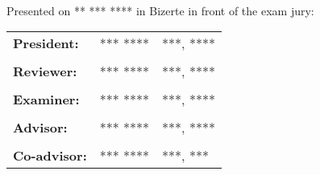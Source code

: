 \begin{titlepage}
\begin{center}
        \HRule \\%
    \end{center}
    \begin{center}
        Presented on ** *** **** in Bizerte in front of the exam jury:\\
    \end{center}
    \begin{center}
        \begin{tabular}{lll}
            \textbf{President:}               & \textsc{*** ****} & ***, \textsc{****}
            \tabularnewline
            \tabularnewline
            \textbf{Reviewer:}              & \textsc{*** ****} & ***, \textsc{****}
            \tabularnewline
            \tabularnewline
            \textbf{Examiner:}                  & \textsc{*** ****} & ***, \textsc{****}
            \tabularnewline
            \tabularnewline
            \textbf{Advisor:} & \textsc{*** ****} & ***, \textsc{****}
            \tabularnewline
            \tabularnewline
            \textbf{Co-advisor:}       & \textsc{*** ****} & ***, \textsc{***}
        \end{tabular}
    \end{center}
    \sloppy
\end{titlepage}

